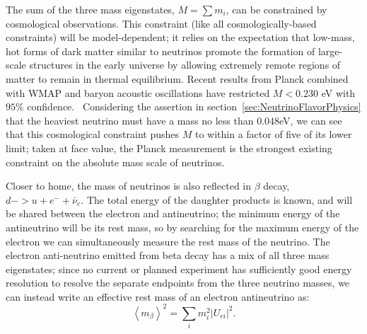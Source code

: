 The sum of the three mass eigenstates, $M = \sum m_i$, can be constrained by cosmological observations.  This constraint (like all cosmologically-based constraints) will be model-dependent; it relies on the expectation that low-mass, hot forms of dark matter similar to neutrinos promote the formation of large-scale structures in the early universe by allowing extremely remote regions of matter to remain in thermal equilibrium.  Recent results from Planck combined with WMAP and baryon acoustic oscillations have restricted $M < 0.230$ eV with $95\%$ confidence.~\cite{CosmologicalLimits}  Considering the assertion in section~\ref{sec:NeutrinoFlavorPhysics} that the heaviest neutrino must have a mass no less than $0.048$eV, we can see that this cosmological constraint pushes $M$ to within a factor of five of its lower limit; taken at face value, the Planck measurement is the strongest existing constraint on the absolute mass scale of neutrinos.

Closer to home, the mass of neutrinos is also reflected in $\beta$ decay, $d -> u + e^- + \bar{\nu}_e$.  The total energy of the daughter products is known, and will be shared between the electron and antineutrino; the minimum energy of the antineutrino will be its rest mass, so by searching for the maximum energy of the electron we can simultaneously measure the rest mass of the neutrino.  The electron anti-neutrino emitted from beta decay has a mix of all three mass eigenstates; since no current or planned experiment has sufficiently good energy resolution to resolve the separate endpoints from the three neutrino masses, we can instead write an effective rest mass of an electron antineutrino as:~\cite{RMPbb0n}
\begin{equation} \label{eqn:DefinitionOfMBeta}
\left< m_\beta \right>^2 = \sum_i m_i^2 \left| U_{ei} \right|^2.
\end{equation}


